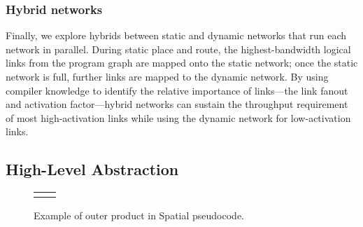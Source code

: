 \subsubsection{Hybrid networks}
Finally, we explore hybrids between static and dynamic networks that run each network in parallel. 
During static place and route, the highest-bandwidth logical links from the program graph are mapped onto the static network; once the static network is full, further links are mapped to the dynamic network.
By using compiler knowledge to identify the relative importance of links---the link fanout and activation factor---hybrid networks can sustain the throughput requirement of most high-activation links while using the dynamic network for low-activation links.

\subsection{High-Level Abstraction} 

\begin{figure}
\centering
\newsavebox{\outerProduct}
\begin{lrbox}{\outerProduct}

\end{lrbox}
\begin{tabular}{m{0.01cm} l} & \usebox{\outerProduct}\\ \end{tabular}
  \caption{Example of outer product in Spatial pseudocode.}
\label{fig:spatial_app}
\end{figure}

